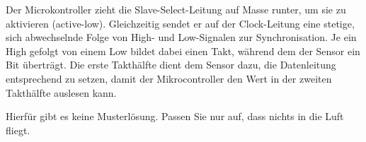 {
    \small
    Der Microkontroller zieht die Slave-Select-Leitung auf Masse runter, um sie
    zu aktivieren (active-low). Gleichzeitig sendet er auf der Clock-Leitung eine
    stetige, sich abwechselnde Folge von High- und Low-Signalen zur Synchronisation.
    Je ein High gefolgt von einem Low bildet dabei einen Takt, während dem der
    Sensor ein Bit überträgt. Die erste Takthälfte dient dem Sensor dazu, die
    Datenleitung entsprechend zu setzen, damit der Mikrocontroller den Wert in
    der zweiten Takthälfte auslesen kann.
}

Hierfür gibt es keine Musterlösung. Passen Sie nur auf, dass nichts in die
Luft fliegt. \smiley
